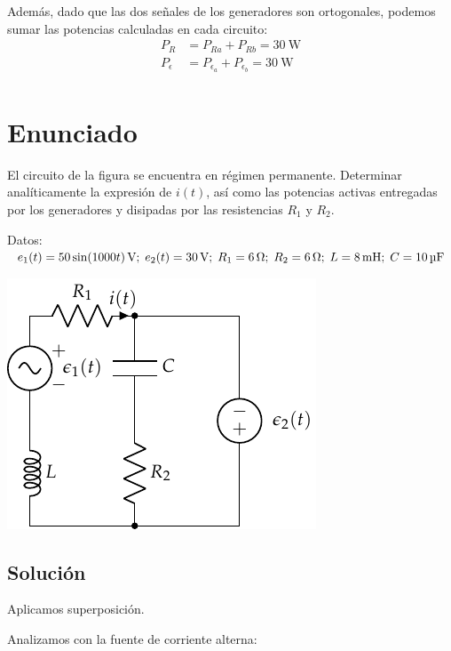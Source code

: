 Además, dado que las dos señales de los generadores son ortogonales, podemos sumar las potencias calculadas en cada circuito:
\begin{align*}
  P_R &= P_{Ra} + P_{Rb} = \qty{30}{\watt}\\
  P_\epsilon &= P_{\epsilon_a} + P_{\epsilon_b} = \qty{30}{\watt}\\
\end{align*}


\section{Enunciado}
El circuito de la figura se encuentra en régimen permanente. Determinar analíticamente la expresión de $i(t)$, así como las potencias activas entregadas por los generadores y disipadas por las resistencias $R_1$ y $R_2$.

\vspace{2mm}
Datos:
  $\; e_1(t) = \qty[parse-numbers=false]{50 \sin(1000 t)}{\volt};\;
  e_2(t) = \qty{30}{\volt};\;
  R_1 = \qty{6}{\ohm};\;
  R_2 = \qty{6}{\ohm};\;
  L = \qty{8}{\milli\henry};\;
  C = \qty{10}{\micro\farad}
  $

\begin{center}
  \includegraphics{figuras/superposicion1_ej.pdf}
\end{center}

 \subsection*{Solución}

Aplicamos superposición.

Analizamos con la fuente de corriente alterna:

